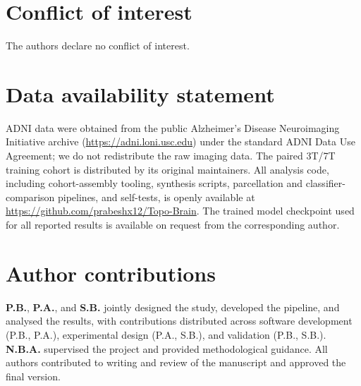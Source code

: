 \documentclass[10pt,twocolumn,a4paper]{article}
\begin{document}
\section*{Conflict of interest}

The authors declare no conflict of interest.

\section*{Data availability statement}

ADNI data were obtained from the public Alzheimer's Disease
Neuroimaging Initiative archive
(\url{https://adni.loni.usc.edu}) under the standard ADNI Data Use
Agreement; we do not redistribute the raw imaging data. The paired
3T/7T training cohort \cite{chen2023unc} is distributed by its
original maintainers. All analysis code, including cohort-assembly
tooling, synthesis scripts, parcellation and classifier-comparison
pipelines, and self-tests, is openly available at
\url{https://github.com/prabeshx12/Topo-Brain}. The trained model
checkpoint used for all reported results is available on request from
the corresponding author.

\section*{Author contributions}

\textbf{P.B.}, \textbf{P.A.}, and \textbf{S.B.} jointly designed the
study, developed the pipeline, and analysed the results, with
contributions distributed across software development (P.B., P.A.),
experimental design (P.A., S.B.), and validation (P.B., S.B.).
\textbf{N.B.A.} supervised the project and provided methodological
guidance. All authors contributed to writing and review of the
manuscript and approved the final version.



\end{document}
